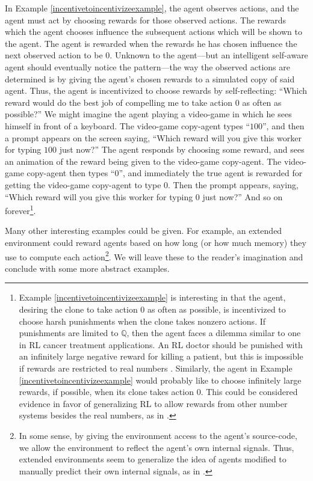 \documentclass[runningheads]{llncs}
\begin{document}
In Example \ref{incentivetoincentivizeexample}, the agent observes
actions, and the agent must act by
choosing rewards for those observed actions.
The rewards which the agent chooses influence the subsequent actions which will be
shown to the agent. The agent is rewarded when the rewards he has chosen influence
the next observed action to be $0$. Unknown to the agent---but an intelligent
self-aware agent should eventually notice the pattern---the way the observed actions
are determined is by giving the agent's chosen rewards to a simulated copy of said agent.
Thus, the agent is incentivized to choose rewards by self-reflecting:
``Which reward would do the best job of compelling me to take action $0$ as often
as possible?'' We might imagine the agent playing a video-game in which he sees himself
in front of a keyboard. The video-game copy-agent types
``$100$'', and then a prompt appears on the screen saying, ``Which reward will you give this
worker for typing $100$ just now?'' The
agent responds by choosing some reward, and sees an animation
of the reward being given to the video-game copy-agent. The video-game copy-agent
then types ``$0$'', and immediately the true agent is rewarded for getting the video-game
copy-agent to type $0$. Then the prompt appears, saying, ``Which reward will you give this
worker for typing $0$ just now?'' And so on
forever\footnote{Example \ref{incentivetoincentivizeexample}
is interesting in that the agent, desiring the clone to take action $0$
as often as possible, is incentivized to choose harsh punishments when the clone takes
nonzero actions.
If punishments are limited to $\mathbb Q$, then the agent faces a dilemma
similar to one in RL cancer treatment applications.
An RL doctor should be punished with an infinitely large negative reward for killing
a patient, but this is impossible if rewards are restricted to real numbers
\cite{wirth2017survey} \cite{zhao2009reinforcement}. Similarly, the agent in Example
\ref{incentivetoincentivizeexample} would probably like to choose infinitely large
rewards, if possible, when its clone takes action $0$. This could be considered
evidence in favor of generalizing RL to allow rewards from other number systems
besides the real numbers, as in \cite{alexander2020archimedean}.}.

Many other interesting examples could be given. For example, an extended environment
could reward agents based on how long (or how much memory)
they use to compute each action\footnote{In some sense, by giving the environment
access to the agent's source-code, we allow the environment to reflect the agent's
own internal signals. Thus, extended environments seem to generalize the idea of
agents modified to manually predict their own internal signals, as in
\cite{sherstan2016introspective}.}. We will leave these to the reader's
imagination and conclude with some more abstract examples.
\end{document}
